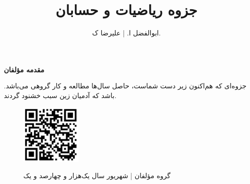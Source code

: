\documentclass[11pt]{book}
\title{ جزوه ریاضیات و حسابان}
\author{ابوالفضل ا. | علیرضا ک.}
\newcommand{\sol}{\bigskip \bigskip \bigskip \bigskip \bigskip \bigskip }
\begin{document}
\maketitle

\thispagestyle{empty}
\textbf{{\LARGE مقدمه مؤلفان}}
\bigskip

جزوه‌ای که هم‌اکنون زیر دست شماست، حاصل سال‌ها مطالعه و کار گروهی می‌باشد.
باشد که آدمیان زین سبب خشنود گردند.
\sol 

\begin{figure}[bp]
\begin{center}
	\includegraphics[width=3cm]{image/QrCode/github-page}
\end{center}

\bigskip

\hfill گروه مؤلفان | شهریور سال یک‌هزار و چهارصد و یک
\end{figure}

\newpage

\clearpage
{}
	
\end{document}
